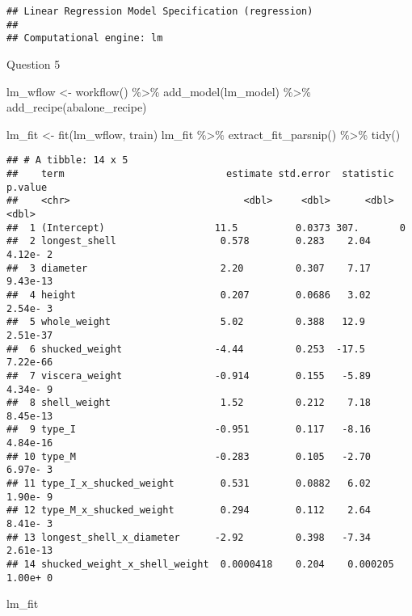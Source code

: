 \documentclass[
]{article}
\newenvironment{Shaded}{\begin{snugshade}}{\end{snugshade}}
\newcommand{\FunctionTok}[1]{\textcolor[rgb]{0.00,0.00,0.00}{#1}}
\newcommand{\NormalTok}[1]{#1}
\newcommand{\OtherTok}[1]{\textcolor[rgb]{0.56,0.35,0.01}{#1}}
\newcommand{\SpecialCharTok}[1]{\textcolor[rgb]{0.00,0.00,0.00}{#1}}
\begin{document}
\begin{verbatim}
## Linear Regression Model Specification (regression)
## 
## Computational engine: lm
\end{verbatim}

Question 5

\begin{Shaded}
\begin{Highlighting}[]
\NormalTok{lm\_wflow }\OtherTok{\textless{}{-}} \FunctionTok{workflow}\NormalTok{() }\SpecialCharTok{\%\textgreater{}\%} 
  \FunctionTok{add\_model}\NormalTok{(lm\_model) }\SpecialCharTok{\%\textgreater{}\%} 
  \FunctionTok{add\_recipe}\NormalTok{(abalone\_recipe)}

\NormalTok{lm\_fit }\OtherTok{\textless{}{-}} \FunctionTok{fit}\NormalTok{(lm\_wflow, train)}
\NormalTok{lm\_fit }\SpecialCharTok{\%\textgreater{}\%}
  \FunctionTok{extract\_fit\_parsnip}\NormalTok{() }\SpecialCharTok{\%\textgreater{}\%}
  \FunctionTok{tidy}\NormalTok{()}
\end{Highlighting}
\end{Shaded}

\begin{verbatim}
## # A tibble: 14 x 5
##    term                            estimate std.error  statistic  p.value
##    <chr>                              <dbl>     <dbl>      <dbl>    <dbl>
##  1 (Intercept)                   11.5          0.0373 307.       0       
##  2 longest_shell                  0.578        0.283    2.04     4.12e- 2
##  3 diameter                       2.20         0.307    7.17     9.43e-13
##  4 height                         0.207        0.0686   3.02     2.54e- 3
##  5 whole_weight                   5.02         0.388   12.9      2.51e-37
##  6 shucked_weight                -4.44         0.253  -17.5      7.22e-66
##  7 viscera_weight                -0.914        0.155   -5.89     4.34e- 9
##  8 shell_weight                   1.52         0.212    7.18     8.45e-13
##  9 type_I                        -0.951        0.117   -8.16     4.84e-16
## 10 type_M                        -0.283        0.105   -2.70     6.97e- 3
## 11 type_I_x_shucked_weight        0.531        0.0882   6.02     1.90e- 9
## 12 type_M_x_shucked_weight        0.294        0.112    2.64     8.41e- 3
## 13 longest_shell_x_diameter      -2.92         0.398   -7.34     2.61e-13
## 14 shucked_weight_x_shell_weight  0.0000418    0.204    0.000205 1.00e+ 0
\end{verbatim}

\begin{Shaded}
\begin{Highlighting}[]
\NormalTok{lm\_fit}
\end{Highlighting}
\end{Shaded}
\end{document}

